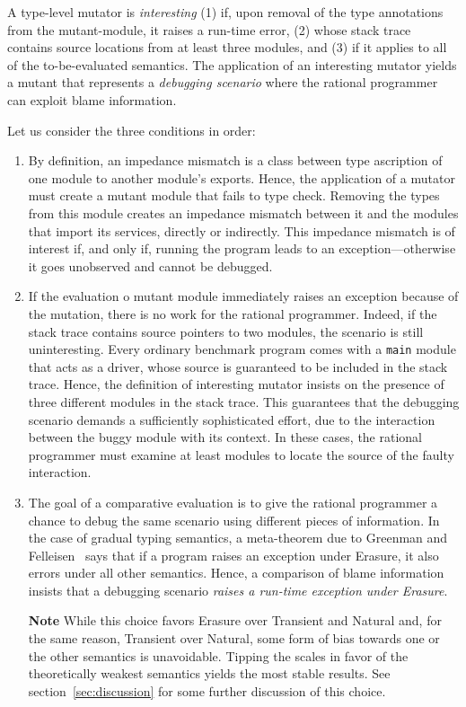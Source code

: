 
A type-level mutator is {\em interesting\/} (1) if, upon removal of the type
annotations from the mutant-module, it raises a run-time error, (2) whose stack
trace contains source locations from at least three modules, and (3) if it
applies to all of the to-be-evaluated semantics. The application of an
interesting mutator yields a mutant that represents a {\em debugging scenario\/}
where the rational programmer can exploit blame information.

Let us consider the three conditions in order:
\begin{enumerate}

\item By definition, an impedance mismatch is a class between type ascription of
one module to another module's exports. Hence, the application of a mutator must
create a mutant module that fails to type check. Removing the types from this
module creates an impedance mismatch between it and the modules that import its
services, directly or indirectly. This impedance mismatch is of interest if, and
only if, running the program leads to an exception---otherwise it goes
unobserved and cannot be debugged. 

\item If the evaluation o mutant module immediately raises an exception because
of the mutation, there is no work for the rational programmer. Indeed, if the
stack trace contains source pointers to two modules, the scenario is still
uninteresting. Every ordinary benchmark program comes with a {\tt main} module
that acts as a driver, whose source is guaranteed to be included in the stack
trace.  Hence, the definition of interesting mutator insists on the presence of
three different modules in the stack trace. This guarantees that the debugging
scenario demands a sufficiently sophisticated effort, due to the interaction
between the buggy module with its context.  In these cases, the rational
programmer must examine at least modules to locate the source of the faulty
interaction.

\item The goal of a comparative evaluation is to give the rational programmer a
chance to debug the same scenario using different pieces of information.  In the
case of gradual typing semantics, a meta-theorem due to Greenman and
Felleisen~\cite{gf-icfp-2018} says that if a program raises an exception under
Erasure, it also errors under all other semantics.  Hence, a comparison of blame
information insists that a debugging scenario {\em raises a run-time exception
under Erasure\/}.

{\bf Note} While this choice favors Erasure over Transient and Natural and, for
the same reason, Transient over Natural, some form of bias towards one or the
other semantics is unavoidable. Tipping the scales in favor of the theoretically
weakest semantics yields the most stable results. See
section~\ref{sec:discussion} for some further discussion of this choice.

\end{enumerate}

